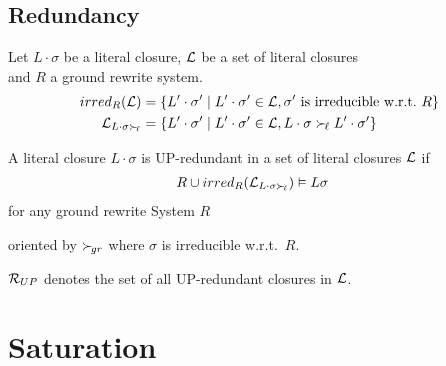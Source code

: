 \documentclass[%
]{beamer}
\begin{document}
\subsection{Redundancy}
\begin{frame}%
    \begin{definition}
        Let $L\cdot\sigma$ be a literal closure,
        $\mathcal{L}$ be a set of literal closures\\
        and $R$ a ground rewrite system.
        \begin{align*}
            irred_R(\mathcal{L}) &= \{
                L'\cdot\sigma' \mid
                L'\cdot\sigma'\in\mathcal{L},
                \sigma'\text{ is irreducible w.r.t.~}R
            \}
            \\
            \mathcal{L}_{L\cdot\sigma\mathrel\succ_{\!\ell}} &= \{
                L'\cdot\sigma' \mid
                L'\cdot\sigma'\in\mathcal{L},
                L\cdot\sigma\mathrel\succ_{\!\ell} L'\cdot\sigma'
            \}
        \end{align*}
    \end{definition}
\begin{definition}
    A literal closure $L\cdot\sigma$ is UP-redundant
    in a set of literal closures $\mathcal{L}$ if
    \begin{align*}
        R \cup irred_R(\mathcal{L}_{L\cdot\sigma\mathrel\succ_{\!\ell}}) &\vDash L\sigma
    \end{align*}
    for any ground rewrite System $R$

    oriented by $\mathrel\succ_{\!gr}$ where $\sigma$ is irreducible w.r.t.~$R$.

    $\mathcal{R}_{UP}$ denotes the set of all UP-redundant closures in $\mathcal{L}$.






\end{definition}
\end{frame}

\section{Saturation}
\end{document}
